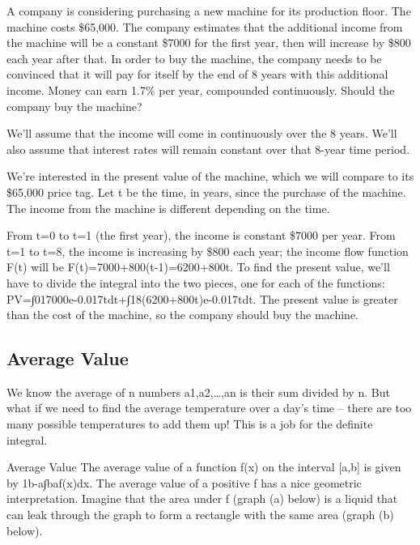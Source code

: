 \begin{example}
A company is considering purchasing a new machine for its production floor. The machine costs \$65,000. The company estimates that the additional income from the machine will be a constant \$7000 for the first year, then will increase by \$800 each year after that. In order to buy the machine, the company needs to be convinced that it will pay for itself by the end of 8 years with this additional income. Money can earn 1.7\% per year, compounded continuously. Should the company buy the machine?

\begin{solution}
  We'll assume that the income will come in continuously over the 8 years. We’ll also assume that interest rates will remain constant over that 8-year time period.

We're interested in the present value of the machine, which we will compare to its \$65,000 price tag. Let t be the time, in years, since the purchase of the machine. The income from the machine is different depending on the time.

From t=0 to t=1 (the first year), the income is constant \$7000 per year. From t=1 to t=8, the income is increasing by \$800 each year; the income flow function F(t) will be F(t)=7000+800(t-1)=6200+800t. To find the present value, we'll have to divide the integral into the two pieces, one for each of the functions:
PV=∫017000e-0.017tdt+∫18(6200+800t)e-0.017tdt.
The present value is greater than the cost of the machine, so the company should buy the machine.
\end{solution}\end{example}

\subsection{Average Value}
We know the average of n numbers a1,a2,…,an is their sum divided by n. But what if we need to find the average temperature over a day's time – there are too many possible temperatures to add them up! This is a job for the definite integral.

Average Value
The average value of a function f(x) on the interval [a,b] is given by
1b-a∫baf(x)dx.
The average value of a positive f has a nice geometric interpretation. Imagine that the area under f (graph (a) below) is a liquid that can leak through the graph to form a rectangle with the same area (graph (b) below).

